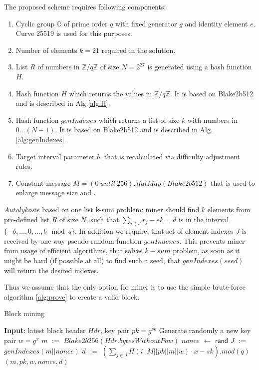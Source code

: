 \documentclass[]{article}
\newcommand{\Name}{$Autolykos$}
\def\Let#1#2{\State #1 $:=$ #2}
\def\LetRnd#1#2{\State #1 $\gets$ #2}
\begin{document}
    The proposed scheme requires following components:
    \begin{enumerate}
        \item Cyclic group $\mathbb{G}$ of prime order $q$ with fixed generator $g$
        and identity element $e$.
        Curve 25519 is used for this purposes.
        \item Number of elements $k=21$ required in the solution.
        \item List $R$ of numbers in $\mathbb{Z}/q\mathbb{Z}$ of size $N=2^{27}$ is generated
        using a hash function $H$.
        \item Hash function $H$ which returns the values in $\mathbb{Z}/q\mathbb{Z}$.
        It is based on Blake2b512 and is described in Alg.\ref{alg:H}.
        \item Hash function $genIndexes$ which returns a list of size $k$ with numbers in $0\dots (N-1)$.
        It is based on Blake2b512 and is described in Alg.\ref{alg:genIndexes}.
        \item Target interval parameter $b$, that is recalculated via difficulty adjustment rules.
        \item Constant message $M=(0~until~256).flatMap(Blake2b512)$ that is used to enlarge message size and .
    \end{enumerate}

    \Name is based on one list k-sum problem: miner should find
    $k$ elements from pre-defined list $R$ of size $N$, such that
    $\sum_{j \in J} r_{j} - sk = d$ is in the interval $\{-b,\dots,0,\dots,b\mod q\}$.
    In addition we require, that set of element indexes $J$ is received
    by one-way pseudo-random function $genIndexes$. This prevents miner
    from usage of efficient algorithms, that solves $k-sum$ problem, as
    soon as it might be hard (if possible at all) to find such a seed,
    that $genIndexes(seed)$ will return the desired indexes.

    Thus we assume that the only option for miner is to use the simple brute-force algorithm \ref{alg:prove} to
    create a valid block.

    \begin{algorithm}[H]
        \caption{Block mining}
        \label{alg:prove}
        \begin{algorithmic}[1]
            \State \textbf{Input}: latest block header $Hdr$, key pair $pk=g^{sk}$
            \State Generate randomly a new key pair $w=g^x$
            \Let{$m$}{$Blake2b256(Hdr.bytesWithoutPow)$}
                \LetRnd{$nonce$}{$\mathsf{rand}$}
                \Let{$J$}{$genIndexes(m||nonce)$}
                \Let{$d$}{$(\sum_{j \in J}{H(i||M||pk||m||w)} \cdot x - sk).mod(q)$}
                \State \Return $(m,pk,w,nonce,d)$
                \EndIf
            \EndWhile
        \end{algorithmic}
    \end{algorithm}
\end{document}
